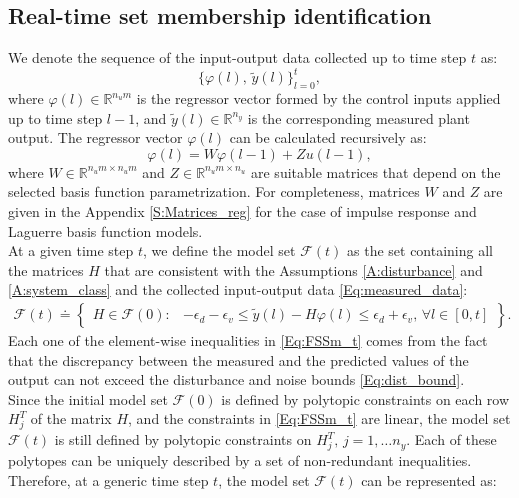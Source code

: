 \documentclass[10 pt, letterpaper]{article}
\newcommand{\beq}{\begin{equation}}
\newcommand{\eeq}{\end{equation}}
\newcommand{\ba}{\begin{array}}
\newcommand{\ea}{\end{array}}
\newcommand{\bR}{{\mathbb R}}
\begin{document}
\subsection{Real-time set membership identification}\label{S:SM_ID}
We denote the sequence of the input-output data collected up to time step $t$ as:
\beq\label{Eq:measured_data}
\{\varphi(l),\,\tilde{y}(l)\}_{l=0}^{t},
\eeq
where $\varphi(l)\in \bR^{n_um}$ is the regressor vector formed by the control inputs applied up to time step $l-1$, and $\tilde{y}(l)\in \bR^{n_y}$ is the corresponding measured plant output. The regressor vector $\varphi(l)$ can be calculated recursively as:
\begin{equation}\label{Eq:recursive_regressor}
\varphi(l)=W\varphi(l-1)+Zu(l-1),
\end{equation}
where $W\in \bR^{n_um \times n_um}$ and $Z \in \bR^{n_um\times n_u}$ are suitable matrices that depend on the selected basis function parametrization. For completeness, matrices $W$ and $Z$ are given in the Appendix \ref{S:Matrices_reg} for the case of impulse response and Laguerre basis function models.\\
At a given time step $t$, we define the model set $\mathcal{F}(t)$ as the set containing all the matrices $H$ that are consistent with the Assumptions \ref{A:disturbance} and \ref{A:system_class} and the collected input-output data \eqref{Eq:measured_data}:
\beq\label{Eq:FSSm_t}
\begin{aligned}
\mathcal{F}(t)\!\doteq\!
\left\{\ba{ll}
H\!\in\! \mathcal{F}(0)\!:\!&-\epsilon_d\!-\!\epsilon_v\leq \tilde{y}(l)\!-\!H\varphi(l)\leq \epsilon_d\!+\!\epsilon_v,\,\forall l \in [0,t]
\ea\right\}\!\!.
\end{aligned}
\eeq
Each one of the element-wise inequalities in \eqref{Eq:FSSm_t} comes from the fact that the discrepancy between the measured and the predicted values of the output can not exceed the disturbance and noise bounds \eqref{Eq:dist_bound}.\\
Since the initial model set $\mathcal{F}(0)$ is defined by polytopic constraints on each row $H_j^T$ of the matrix $H$, and the constraints in \eqref{Eq:FSSm_t} are linear, the model set $\mathcal{F}(t)$ is still defined by polytopic constraints on $H_j^T,\, j=1,\hdots n_y$. Each of these polytopes can be uniquely described by a set of non-redundant inequalities. Therefore, at a generic time step $t$, the model set $\mathcal{F}(t)$ can be represented as:
\end{document}

